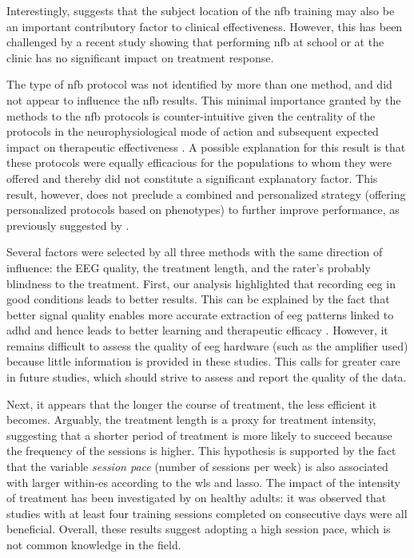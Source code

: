 Interestingly, \citep{Minder2018} suggests that the subject location of the \gls{nfb} training may also be an important contributory 
factor to clinical effectiveness. However, this has been challenged by a recent study \citep{Minder2018} showing that 
performing \gls{nfb} at school or at the clinic has no significant impact on treatment response. 

The type of \gls{nfb} protocol was not identified by more than one method, and did not appear to influence the \gls{nfb} results. 
This minimal importance granted by the methods to the \gls{nfb} protocols is counter-intuitive given the centrality of the 
protocols in the neurophysiological mode of action and subsequent expected impact on
therapeutic effectiveness \citep{Vernon2004}. A possible explanation for this result is that these protocols were equally 
efficacious for the populations to whom they were offered and thereby did not constitute a significant explanatory factor. 
This result, however, does not preclude a combined and personalized strategy (offering personalized protocols based on phenotypes)
to further improve performance, as previously suggested by \citet{Alkoby2017}.

Several factors were selected by all three methods with the same direction of influence: the EEG quality, the treatment 
length, and the rater's probably blindness to the treatment. First, our analysis highlighted that recording \gls{eeg} 
in good conditions leads to better results.
This can be explained by the fact that better signal quality enables more accurate extraction of \gls{eeg} patterns
linked to \gls{adhd} and hence leads to better learning and therapeutic efficacy \citep{Congedo2004}. 
However, it remains difficult to assess the quality of \gls{eeg} hardware (such as the amplifier used) 
because little information is provided in these studies.  
This calls for greater care in future studies, which should strive to assess and report the quality of the data.

Next, it appears that the longer the course of treatment, the less efficient it becomes. Arguably, the treatment length is a
proxy for treatment intensity, suggesting that a shorter period of treatment is more likely to succeed because the frequency of the sessions
is higher. This hypothesis is supported by the fact that the variable \emph{session pace} (number of
sessions per week) is also associated with larger within-\gls{es} according to the \gls{wls} and \gls{lasso}. The impact of the
intensity of treatment has been investigated by \citep{Rogala2016} on healthy adults: it was observed that studies with
at least four training sessions completed on consecutive days were all beneficial. Overall, these results suggest adopting a high session pace, 
which is not common knowledge in the field.

